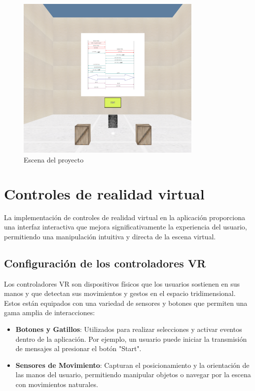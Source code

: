 \documentclass[a4paper, 12pt]{book}
\begin{document}
\begin{figure}
  \centering
  \includegraphics[width=9cm, keepaspectratio]{img/escena.png}
  \caption{Escena del proyecto}
  \label{fig:arquitectura}
\end{figure}


\section{Controles de realidad virtual}
\label{sec:controles_vr}

La implementación de controles de realidad virtual en la aplicación proporciona una interfaz interactiva que mejora significativamente la experiencia del usuario, 
permitiendo una manipulación intuitiva y directa de la escena virtual.

\subsection{Configuración de los controladores VR}
\label{subsec:configuracion_controladores_vr}

Los controladores VR son dispositivos físicos que los usuarios sostienen en sus manos y que detectan sus movimientos y gestos en el espacio tridimensional. 
Estos están equipados con una variedad de sensores y botones que permiten una gama amplia de interacciones:

\begin{itemize}
  \item \textbf{Botones y Gatillos}: Utilizados para realizar selecciones y activar eventos dentro de la aplicación. 
  Por ejemplo, un usuario puede iniciar la transmisión de mensajes al presionar el botón "Start".
  \item \textbf{Sensores de Movimiento}: Capturan el posicionamiento y la orientación de las manos del usuario, 
  permitiendo manipular objetos o navegar por la escena con movimientos naturales.
\end{itemize}
\end{document}
